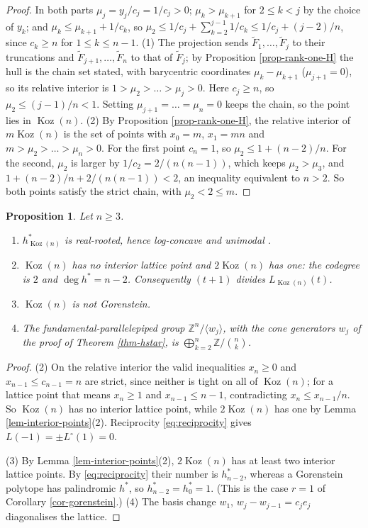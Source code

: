 \documentclass[11pt, a4paper, abstract=yes]{scrartcl}
\theoremstyle{definition}
\theoremstyle{remark}
\theoremstyle{plain}
\newtheorem{proposition}[definition]{Proposition}
\theoremstyle{remark}
\theoremstyle{plain}
\newcommand{\Koz}{\operatorname{Koz}}
\newcommand{\leannone}{\tikz[baseline=-0.6ex]\draw[leannone,line width=0.6pt] (0,0) circle (0.55ex);}
\newcommand{\leanmark}[1]{\leavevmode{\reversemarginpar\marginnote{\raggedleft#1}}}
\begin{document}
\begin{proof}
In both parts \(\mu_j=y_j/c_j=1/c_j>0\); \(\mu_k>\mu_{k+1}\) for \(2\le k<j\) by the choice of
\(y_k\); and \(\mu_k\le\mu_{k+1}+1/c_k\), so \(\mu_2\le1/c_j+\sum_{k=2}^{j-1}1/c_k\le1/c_j+(j-2)/n\),
since \(c_k\ge n\) for \(1\le k\le n-1\).
(1) The projection sends \(\tilde F_1,\dots,\tilde F_j\) to their truncations and
\(\tilde F_{j+1},\dots,\tilde F_n\) to that of \(\tilde F_j\); by Proposition \ref{prop-rank-one-H} the
hull is the chain set stated, with barycentric coordinates \(\mu_k-\mu_{k+1}\) (\(\mu_{j+1}=0\)), so its
relative interior is \(1>\mu_2>\dots>\mu_j>0\). Here \(c_j\ge n\), so \(\mu_2\le(j-1)/n<1\). Setting
\(\mu_{j+1}=\dots=\mu_n=0\) keeps the chain, so the point lies in \(\Koz(n)\).
(2) By Proposition \ref{prop-rank-one-H}, the relative interior of \(m\Koz(n)\) is the set of points
with \(x_0=m\), \(x_1=mn\) and \(m>\mu_2>\dots>\mu_n>0\). For the first point \(c_n=1\), so
\(\mu_2\le1+(n-2)/n\). For the second, \(\mu_2\) is larger by \(1/c_2=2/(n(n-1))\), which keeps
\(\mu_2>\mu_3\), and \(1+(n-2)/n+2/(n(n-1))<2\), an inequality equivalent to \(n>2\). So both points
satisfy the strict chain, with \(\mu_2<2\le m\).
\end{proof}

\begin{proposition}
\leanmark{\leannone}Let \(n\ge3\).
\begin{enumerate}
\item \(h^*_{\Koz(n)}\) is real-rooted, hence log-concave and unimodal \autocite{SavageVisontai2015}.
\item \(\Koz(n)\) has no interior lattice point and \(2\Koz(n)\) has one: the codegree is \(2\) and
\(\deg h^*=n-2\). Consequently \((t+1)\) divides \(L_{\Koz(n)}(t)\).
\item \(\Koz(n)\) is not Gorenstein.
\item The fundamental-parallelepiped group \(\mathbb Z^n/\langle w_j\rangle\), with the cone generators
\(w_j\) of the proof of Theorem \ref{thm-hstar}, is \(\bigoplus_{k=2}^n\mathbb Z/\binom nk\).
\end{enumerate}
\label{prop-hstar-props}
\end{proposition}

\begin{proof}
(2) On the relative interior the valid inequalities \(x_n\ge0\) and \(x_{n-1}\le c_{n-1}=n\) are
strict, since neither is tight on all of \(\Koz(n)\); for a lattice point that means \(x_n\ge1\) and
\(x_{n-1}\le n-1\), contradicting \(x_n\le x_{n-1}/n\). So \(\Koz(n)\) has no interior lattice point,
while \(2\Koz(n)\) has one by Lemma \ref{lem-interior-points}(2). Reciprocity \eqref{eq:reciprocity}
gives \(L(-1)=\pm L^\circ(1)=0\).

(3) By Lemma \ref{lem-interior-points}(2), \(2\Koz(n)\) has at least two interior lattice points. By
\eqref{eq:reciprocity} their number is \(h^*_{n-2}\), whereas a Gorenstein polytope has palindromic \(h^*\), so
\(h^*_{n-2}=h^*_0=1\). (This is the case \(r=1\) of Corollary \ref{cor-gorenstein}.)
(4) The basis change \(w_1\), \(w_j-w_{j-1}=c_je_j\) diagonalises the lattice.
\end{proof}
\end{document}
